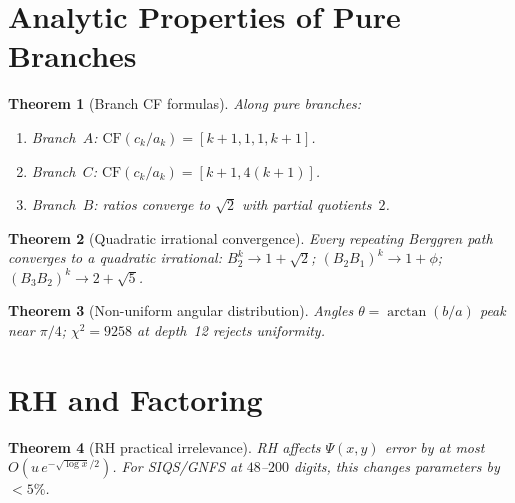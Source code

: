 \documentclass[12pt]{amsart}
\newtheorem{theorem}{Theorem}[section]
\theoremstyle{definition}
\theoremstyle{remark}
\begin{document}

\section{Analytic Properties of Pure Branches}\label{sec:branches}

\begin{theorem}[Branch CF formulas]\label{thm:cf}
Along pure branches:
\begin{enumerate}[label=(\alph*)]
  \item Branch~$A$: $\mathrm{CF}(c_k/a_k) = [k+1, 1, 1, k+1]$.
  \item Branch~$C$: $\mathrm{CF}(c_k/a_k) = [k+1, 4(k+1)]$.
  \item Branch~$B$: ratios converge to $\sqrt{2}$ with partial quotients~$2$.
\end{enumerate}
\end{theorem}

\begin{theorem}[Quadratic irrational convergence]\label{thm:qi-conv}
Every repeating Berggren path converges to a quadratic irrational:
$B_2^k \to 1 + \sqrt{2}$; $(B_2 B_1)^k \to 1 + \phi$;
$(B_3 B_2)^k \to 2 + \sqrt{5}$.
\end{theorem}

\begin{theorem}[Non-uniform angular distribution]\label{thm:angular}
Angles $\theta = \arctan(b/a)$ peak near $\pi/4$; $\chi^2 = 9258$ at
depth~12 rejects uniformity.
\end{theorem}


\section{RH and Factoring}\label{sec:rh-factoring}

\begin{theorem}[RH practical irrelevance]\label{thm:rh-fact}
RH affects $\Psi(x,y)$ error by at most $O(u\,e^{-\sqrt{\log x}/2})$.
For SIQS/GNFS at $48$--$200$ digits, this changes parameters by $< 5\%$.
\end{theorem}
\end{document}
